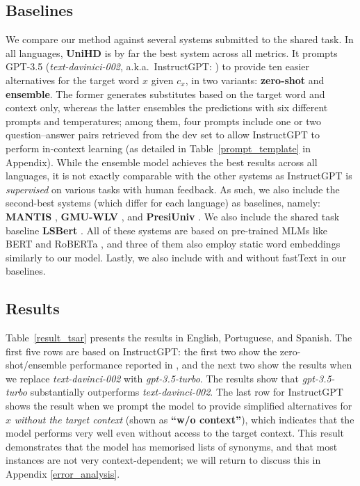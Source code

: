 \documentclass[11pt]{article}
\newcommand{\tabref}[2][]{Table#1~\ref{#2}\xspace}
\newcommand{\ex}[1]{\textit{#1}\xspace}
\begin{document}
\subsection{Baselines}

We compare our method against several systems submitted to the shared task. In all languages, \textbf{UniHD} \cite{aumiller-gertz-2022-unihd} is by far the best system across all metrics. It prompts GPT-3.5 (\ex{text-davinici-002}, a.k.a.\ InstructGPT: \citet{gpt-3,gpt-3.5}) to provide ten easier alternatives for the target word $x$ given $c_x$, in two variants: \textbf{zero-shot} and \textbf{ensemble}. The former generates substitutes based on the target word and context only, whereas the latter ensembles the predictions with six different prompts and temperatures; among them, four prompts include one or two question--answer pairs retrieved from the dev set to allow InstructGPT to perform in-context learning (as detailed in \tabref[]{prompt_template} in Appendix). While the ensemble model achieves the best results across all languages, it is not exactly comparable with the other systems as InstructGPT is {\it supervised} on various tasks with human feedback. As such, we also include the second-best systems (which differ for each language) as baselines, namely: \textbf{MANTIS} \cite{li-etal-2022-mantis}, \textbf{GMU-WLV} \cite{north-etal-2022-gmu}, and \textbf{PresiUniv} \cite{whistely-etal-2022-presiuniv}. We also include the shared task baseline \textbf{LSBert} \cite{qiang2020BERTLS,DBLP:journals/corr/abs-2006-14939}. All of these systems are based on pre-trained MLMs like BERT \cite{bert} and RoBERTa \cite{roberta}, and three of them also employ static word embeddings similarly to our model. Lastly, we also include \citet{wada-etal-2022-unsupervised} with and without fastText in our baselines.

\subsection{Results}
\tabref[]{result_tsar} presents the results in English, Portuguese, and Spanish. The first five rows are based on InstructGPT: the first two show the zero-shot/ensemble performance reported in \citet{aumiller-gertz-2022-unihd}, and the next two show the results when we replace {\it text-davinci-002} with {\it gpt-3.5-turbo}. The results show that {\it gpt-3.5-turbo} substantially outperforms {\it text-davinci-002}. The last row for InstructGPT shows the result when we prompt the model to provide simplified alternatives for $x$ \ex{without the target context} (shown as \textbf{``w/o context''}), which indicates that the model performs very well {even without access to the target context}. This result demonstrates that the model has memorised lists of synonyms, and that most instances are not very context-dependent; we will return to discuss this in Appendix \ref{error_analysis}.
\end{document}
